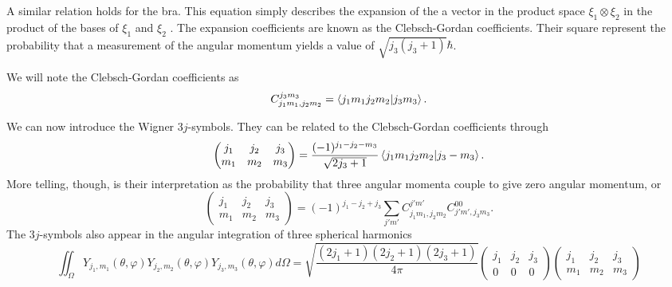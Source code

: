 A similar relation holds for the bra. This equation simply 
describes the expansion of the a vector in the product space
$\xi_1\otimes\xi_2$ in the product of the bases of $\xi_1$ 
and $\xi_2$ \cite{COH1973b}. The expansion coefficients are known as the 
Clebsch-Gordan coefficients. Their square represent 
the probability that a measurement of the angular momentum 
yields a value of $\sqrt{j_3(j_3+1)}\hbar$.

We will note the Clebsch-Gordan coefficients
as
  \begin{equation}
    C^{j_3m_3}_{j_1m_1,j_2m_2} = \braket{j_1m_1j_2m_2|j_3m_3}.
  \end{equation}

We can now introduce the Wigner $3j$-symbols. They can be related
to the Clebsch-Gordan coefficients through
  \begin{equation}
   \begin{pmatrix} j_1 & j_2 & j_3 \\
		   m_1 & m_2 & m_3
   \end{pmatrix}
    = \frac{(-1)^{j_1-j_2-m_3}}{\sqrt{2j_3+1}}\braket{j_1m_1j_2m_2|j_3-m_3}.
  \end{equation}
More telling, though, is their interpretation as the probability
that three angular momenta couple to give zero angular momentum, or
  \begin{equation}
   \begin{pmatrix} j_1 & j_2 & j_3 \\
		   m_1 & m_2 & m_3
   \end{pmatrix}
    = (-1)^{j_1-j_2+j_3}\sum_{j'm'} C^{j'm'}_{j_1m_1,j_2m_2}C^{00}_{j'm',j_3m_3}.
  \end{equation}
The $3j$-symbols also appear in the angular integration of three spherical
harmonics 
  \begin{equation}
    \mathop{\iint}_\Omega Y_{j_1,m_1}(\theta,\varphi)Y_{j_2,m_2}(\theta,\varphi)Y_{j_3,m_3}(\theta,\varphi)d\Omega
      =
    \sqrt{\frac{(2j_1+1)(2j_2+1)(2j_3+1)}{4\pi}}\begin{pmatrix} j_1 & j_2 & j_3 \\ 0 & 0 & 0 \end{pmatrix}\begin{pmatrix} j_1 & j_2 & j_3 \\ m_1 & m_2 & m_3\end{pmatrix}
  \end{equation}

